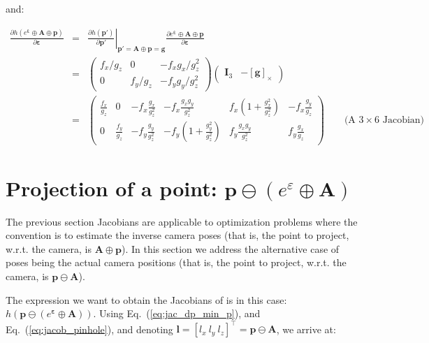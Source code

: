 \documentclass[a4paper,11pt]{report}
\newcommand{\E}{{\bm{\varepsilon}}}
\newcommand{\A}{{\mathbf{A}}}
\begin{document}
\noindent and:

\begin{eqnarray}
\frac{\partial h(e^\E \oplus \A \oplus \mathbf{p})}{\partial \mathbf{\E}} 
&=& 
\left. \frac{\partial h(\mathbf{p'})}{\partial \mathbf{p'}} \right|_{ \mathbf{p'} = \A \oplus \mathbf{p} = \mathbf{g} }
\frac{\partial e^\E \oplus \A \oplus \mathbf{p} }{\partial \E} \\
&=& 
\left(
\begin{array}{ccc}
 f_x / g_z   &    0    &  -f_x g_x / g_z^2   \\
 0 & f_y / g_z  &  -f_y g_y / g_z^2   
\end{array}
\right)
\left(
\begin{array}{cc}
 \mathbf{I}_3   & - \left[ \mathbf{g} \right]_\times
\end{array}
\right) \\
&=&
\left(
\begin{array}{cccccc}
 \frac{f_x}{g_z}  & 
 0 &
 -f_x\frac{g_x}{g_z^2} &
 -f_x \frac{g_x g_y}{g_z^2} &
  f_x  (1 + \frac{g_x^2}{g_z^2} )  &
 -f_x \frac{g_y}{g_z} 
\\
 0 & 
 \frac{f_y}{g_z}  & 
 -f_y\frac{g_y}{g_z^2} 
 &
  -f_y (1 + \frac{g_y^2}{g_z^2}) &
  f_y \frac{g_x g_y}{g_z^2} &
  f_y \frac{g_x}{g_z}
\end{array}
\right)
\quad\quad \text{(A $3 \times 6$ Jacobian)} \nonumber
\end{eqnarray}



\newpage

\section{Projection of a point: $\mathbf{p} \ominus (e^\varepsilon \oplus \mathbf{A})$}

The previous section Jacobians are applicable to optimization problems 
where the convention is to estimate the inverse camera poses 
(that is, the point to project, w.r.t. the camera, is $\A \oplus \mathbf{p}$).
In this section we address the alternative case of poses being the actual 
camera positions
(that is, the point to project, w.r.t. the camera, is $\mathbf{p} \ominus \A$).

The expression we want to obtain the Jacobians of is in this case: 
$h(\mathbf{p} \ominus (e^\E \oplus \A))$.
Using Eq.~(\ref{eq:jac_dp_min_p}),
and  Eq.~(\ref{eq:jacob_pinhole}),
and denoting $\mathbf{l}=[l_x ~ l_y ~ l_z]^\top=\mathbf{p} \ominus \A$, 
we arrive at:
\end{document}
